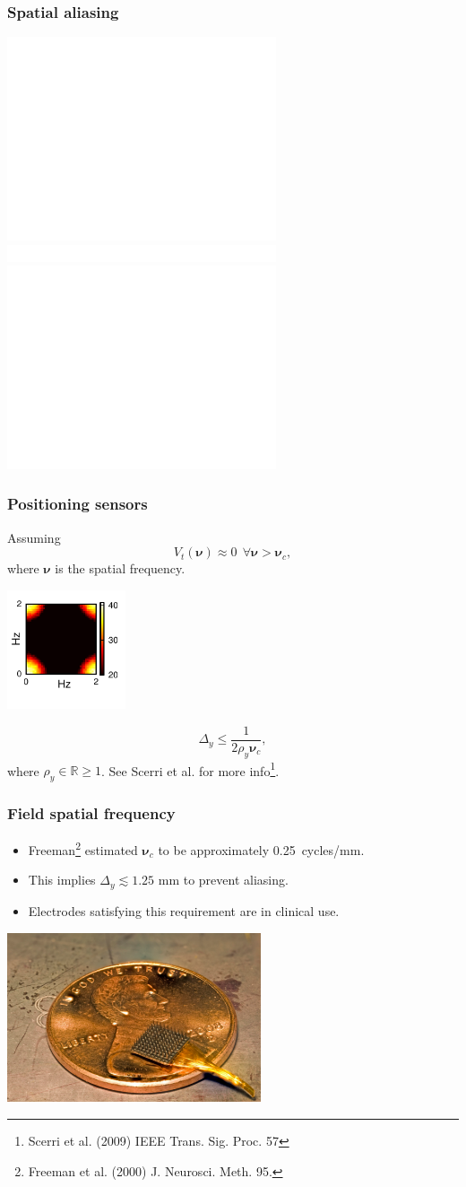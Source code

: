 \documentclass[compress]{beamer}
\begin{document}
\begin{frame}\frametitle{Spatial aliasing}
	\includegraphics<1-2>[height=6cm]{./Figures/205px-Moire_pattern_of_bricks.pdf}
	\includegraphics<2>[height=0.5cm]{./Figures/WhiteSpace.pdf}
	\includegraphics<2>[height=6cm]{./Figures/Moire_pattern_of_bricks_small.pdf}	
\end{frame}

\begin{frame}\frametitle{Positioning sensors}
Assuming
\begin{equation}
	V_t(\boldsymbol{\nu}) \approx 0 ~ \ \forall \boldsymbol{\nu} > \boldsymbol{\nu}_c,
\end{equation}
where $\boldsymbol\nu$ is the spatial frequency. 
\begin{center}
\includegraphics[height=3.5cm]{./Figures/Figure4a.pdf}
\end{center}
\pause
\begin{equation}
	\label{eq:MinimumSensorDistance} \Delta_y \leq \frac{1}{2\rho_y\boldsymbol{\nu}_{c}}, 
\end{equation}
where $\rho_y \in \mathbb{R} \ge 1$. See Scerri et al. for more info\footnote{Scerri et al. (2009) IEEE Trans. Sig. Proc. 57}. \\ 
\end{frame}

\begin{frame}\frametitle{Field spatial frequency}
	\begin{itemize}
\item Freeman\footnote{Freeman et al. (2000) J. Neurosci. Meth. 95.} estimated $\boldsymbol{\nu}_c$ to be approximately 0.25~cycles/mm.
\pause
  \item This implies $\Delta_y \lesssim 1.25$ mm to prevent aliasing.
\pause
  \item Electrodes satisfying this requirement are in clinical use.
 \end{itemize}
	\begin{center}
		\includegraphics[height=5cm]{./Figures/Utaharray.pdf}
	\end{center}
\end{frame}
\end{document}
